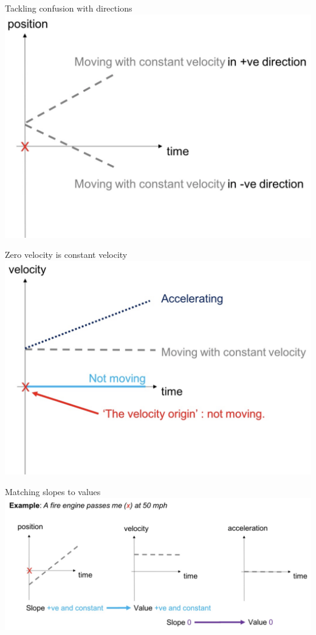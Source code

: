 \begin{frame}{Tackling confusion with directions}
\notsotiny
\includegraphics[scale=0.3]{PositionTime}

\end{frame}

\begin{frame}{Zero velocity is constant velocity}
\notsotiny
\includegraphics[scale=0.3]{VelocityTime}

\end{frame}


\begin{frame}{Matching slopes to values}
\notsotiny
\includegraphics[scale=0.4]{FireEngine}

\end{frame}


